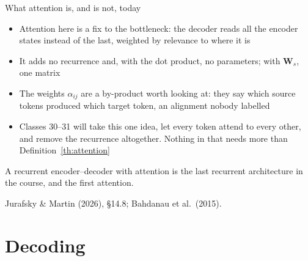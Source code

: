 \documentclass[aspectratio=169, 11pt]{beamer}
\newcommand{\srcline}[1]{%
  \par\vspace{0.25em}%
  {\scriptsize\color{mcMuted}\hfill #1\par}}
\begin{document}
\begin{frame}{What attention is, and is not, today}
  \vspace{0.05em}
  {\footnotesize
  \begin{itemize}\itemsep0.30em
    \item Attention here is a \alert{fix to the bottleneck}: the decoder
          reads all the encoder states instead of the last, weighted
          by relevance to where it is
    \item It adds no recurrence and, with the dot product, no
          parameters; with $\mathbf{W}_s$, one matrix
    \item The weights $\alpha_{ij}$ are a by-product worth looking at:
          they say which source tokens produced which target token,
          an alignment nobody labelled
    \item Classes 30--31 will take this one idea, let every token attend
          to every other, and remove the recurrence altogether. Nothing
          in that needs more than Definition~\ref{th:attention}
  \end{itemize}}
  \vspace{0.3em}
  \begin{redhighlight}
    A recurrent encoder--decoder with attention is the last recurrent
    architecture in the course, and the first attention.
  \end{redhighlight}
  \srcline{Jurafsky \& Martin (2026), \S14.8; Bahdanau et al.\ (2015).}
\end{frame}

\section{Decoding}
\end{document}
